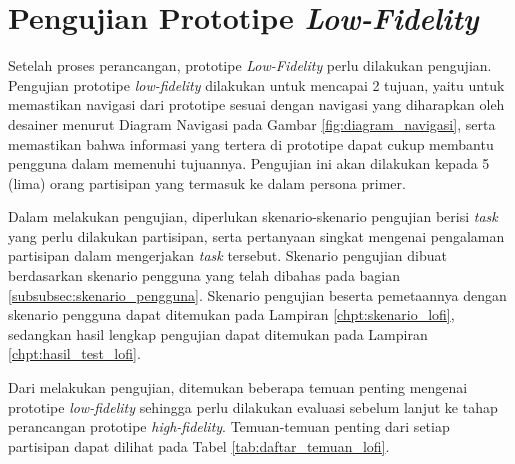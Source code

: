 \section{Pengujian Prototipe \textit{Low-Fidelity}}
\label{sec:lofi_test}
Setelah proses perancangan, prototipe \textit{Low-Fidelity} perlu dilakukan pengujian. Pengujian prototipe \textit{low-fidelity} dilakukan untuk mencapai 2 tujuan, yaitu untuk memastikan navigasi dari prototipe sesuai dengan navigasi yang diharapkan oleh desainer menurut Diagram Navigasi pada Gambar \ref{fig:diagram_navigasi}, serta memastikan bahwa informasi yang tertera di prototipe dapat cukup membantu pengguna dalam memenuhi tujuannya. Pengujian ini akan dilakukan kepada 5 (lima) orang partisipan yang termasuk ke dalam persona primer.


Dalam melakukan pengujian, diperlukan skenario-skenario pengujian berisi \textit{task} yang perlu dilakukan partisipan, serta pertanyaan singkat mengenai pengalaman partisipan dalam mengerjakan \textit{task} tersebut. Skenario pengujian dibuat berdasarkan skenario pengguna yang telah dibahas pada bagian \ref{subsubsec:skenario_pengguna}. Skenario pengujian beserta pemetaannya dengan skenario pengguna dapat ditemukan pada Lampiran \ref{chpt:skenario_lofi}, sedangkan hasil lengkap pengujian dapat ditemukan pada Lampiran \ref{chpt:hasil_test_lofi}.

Dari melakukan pengujian, ditemukan beberapa temuan penting mengenai prototipe \textit{low-fidelity} sehingga perlu dilakukan evaluasi sebelum lanjut ke tahap perancangan prototipe \textit{high-fidelity}. Temuan-temuan penting dari setiap partisipan dapat dilihat pada Tabel \ref{tab:daftar_temuan_lofi}.

\newcommand{\cditem}[1]{\colorbox{white}{\raisebox{7pt}{\begin{minipage}[t]{0.8\textwidth}\linespread{1}\selectfont \begin{enumerate}[parsep=0pt, leftmargin=*] #1 \end{enumerate} \end{minipage}}}}

